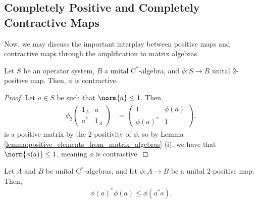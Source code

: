 \subsection{Completely Positive and Completely Contractive Maps}%
Now, we may discuss the important interplay between positive maps and contractive maps through the amplification to matrix algebras.
\begin{proposition}\label{prop:two_positive_contractive}
  Let $S$ be an operator system, $B$ a unital $\mathrm{C}^{\ast}$-algebra, and $\phi\colon S\rightarrow B$ unital $2$-positive map. Then, $\phi$ is contractive.
\end{proposition}
\begin{proof}
  Let $a\in S$ be such that $\norm{a}\leq 1$. Then,
  \begin{align*}
    \phi_2 \begin{pmatrix}1_A & a \\ a^{\ast} & 1_A\end{pmatrix} &= \begin{pmatrix} 1 & \phi\left( a \right) \\ \phi\left( a \right)^{\ast} & 1\end{pmatrix},
  \end{align*}
  is a positive matrix by the $2$-positivity of $\phi$, so by Lemma \ref{lemma:positive_elements_from_matrix_algebras} (i), we have that $\norm{\phi(a)}\leq 1$, meaning $\phi$ is contractive.
\end{proof}
\begin{proposition}
  Let $A$ and $B$ be unital $\mathrm{C}^{\ast}$-algebras, and let $\phi\colon A\rightarrow B$ be a unital $2$-positive map. Then,
  \begin{align*}
    \phi\left( a \right)^{\ast}\phi\left( a \right)\leq \phi\left( a^{\ast}a \right).
  \end{align*}
\end{proposition}
